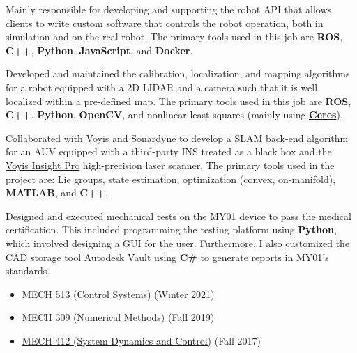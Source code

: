 \documentclass[10pt,letter]{altacv}
\begin{document}
Mainly responsible for developing and supporting the robot API that allows clients to write custom software that controls the robot operation, both in simulation and on the real robot.
The primary tools used in this job are \textbf{ROS}, \textbf{C++}, \textbf{Python}, \textbf{JavaScript}, and \textbf{Docker}.

\divider

Developed and maintained the calibration, localization, and mapping algorithms for a robot equipped with a 2D LIDAR and a camera such that it is well localized within a pre-defined map.
The primary tools used in this job are \textbf{ROS}, \textbf{C++}, \textbf{Python}, \textbf{OpenCV}, and nonlinear least squares (mainly using \href{https://github.com/ceres-solver/ceres-solver}{\textbf{Ceres}}).

\divider

Collaborated with \href{https://voyis.com/}{Voyis} and \href{https://www.sonardyne.com/}{Sonardyne} to develop a SLAM back-end algorithm for an AUV equipped with a third-party INS treated as a black box and the \href{https://voyis.com/insight-pro}{Voyis Insight Pro} high-precision laser scanner.
The primary tools used in the project are:
Lie groups, state estimation, optimization (convex, on-manifold), \textbf{MATLAB}, and \textbf{C++}.

\divider

Designed and executed mechanical tests on the MY01 device to pass the medical certification.
This included programming the testing platform using \textbf{Python}, which involved designing a GUI for the user.
Furthermore, I also customized the CAD storage tool Autodesk Vault using \textbf{C\#} to generate reports in MY01's standards.

\divider

\begin{itemize}[noitemsep]
  \item \href{https://www.mcgill.ca/study/2022-2023/courses/mech-513}{MECH 513 (Control Systems)} (Winter 2021)
  \item \href{https://www.mcgill.ca/study/2022-2023/courses/mech-309}{MECH 309 (Numerical Methods)} (Fall 2019)
  \item \href{https://www.mcgill.ca/study/2022-2023/courses/mech-412}{MECH 412 (System Dynamics and Control)} (Fall 2017)
\end{itemize}
\end{document}
